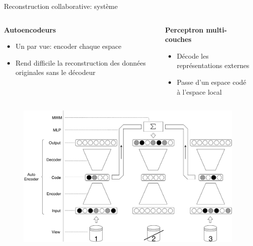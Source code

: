 \documentclass[hyperref={pdfpagelabels=false}]{beamer}
\begin{document}
    \begin{frame}{Reconstruction collaborative: système}
        \begin{columns}
            \fontsize{10pt}{12pt}
            \begin{column}{0.5\textwidth}
                \textbf{Autoencodeurs}
                \begin{itemize}
                    \item Un par vue: encoder chaque espace
                    \item Rend difficile la reconstruction des données 
                        originales sans le décodeur
                \end{itemize}
            \end{column}
            \begin{column}{0.5\textwidth}
                \textbf{Perceptron multi-couches}
                \begin{itemize}
                    \item Décode les représentations externes
                    \item Passe d'un espace codé à l'espace local
                \end{itemize}
            \end{column}
        \end{columns}
        \begin{figure}[h]
            \centering
            \includegraphics[scale=.20]{base_system.pdf}
        \end{figure}
    \end{frame}
\end{document}
